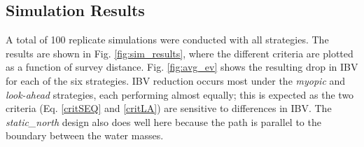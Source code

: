 \subsection{Simulation Results}

A total of 100 replicate simulations were conducted with all
strategies. The results are shown in Fig. \ref{fig:sim_results}, where
the different criteria are plotted as a function of survey
distance. Fig. \ref{fig:avg_ev} shows the resulting drop in IBV for
each of the six strategies. IBV reduction occurs most under the
\textit{myopic} and \textit{look-ahead} strategies, each performing
almost equally; this is expected as the two criteria
(Eq. \eqref{critSEQ} and \eqref{critLA}) are sensitive to differences
in IBV. The \textit{static\_north} design also does well here because
the path is parallel to the boundary between the water masses.

